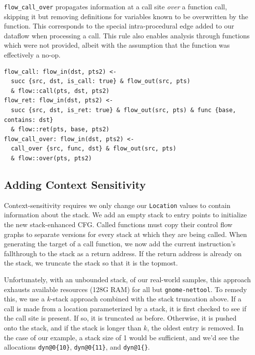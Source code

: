 \texttt{flow\_call\_over} propagates information at a call site \emph{over} a function call, skipping it but removing definitions for variables known to be overwritten by the function.
This corresponds to the special intra-procedural edge added to our dataflow when processing a call.
This rule also enables analysis through functions which were not provided, albeit with the assumption that the function was effectively a no-op.

\begin{lstlisting}[float=*t, caption={Inter-procedural Rules}, label=lst:interrules]
flow_call: flow_in(dst, pts2) <-
  succ {src, dst, is_call: true} & flow_out(src, pts)
  & flow::call(pts, dst, pts2)
flow_ret: flow_in(dst, pts2) <-
  succ {src, dst, is_ret: true} & flow_out(src, pts) & func {base, contains: dst}
  & flow::ret(pts, base, pts2)
flow_call_over: flow_in(dst, pts2) <-
  call_over {src, func, dst} & flow_out(src, pts)
  & flow::over(pts, pts2)
\end{lstlisting}





\subsection{Adding Context Sensitivity}
Context-sensitivity requires we only change our \texttt{Location}
values to contain information about the stack.
We add an empty stack to entry points to initialize the new stack-enhanced CFG.
Called functions must copy their control flow graphs to separate versions for every stack at which they are being called.
When generating the target of a call function, we now add the current instruction's fallthrough to the stack as a return address.
If the return address is already on the stack, we truncate the stack so that it is the topmost.

Unfortunately, with an unbounded stack, of our real-world samples, this approach exhausts available resources (128G RAM) for all but \texttt{gnome-nettool}.
To remedy this, we use a $k$-stack approach combined with the stack truncation above.
If a call is made from a location parameterized by a stack, it is first checked to see if the call site is present.
If so, it is truncated as before.
Otherwise, it is pushed onto the stack, and if the stack is longer than $k$, the oldest entry is removed.
In the case of our example, a stack size of 1 would be sufficient, and we'd see the allocations \texttt{dyn@0\{10\}}, \texttt{dyn@0\{11\}}, and \texttt{dyn@1\{\}}.

